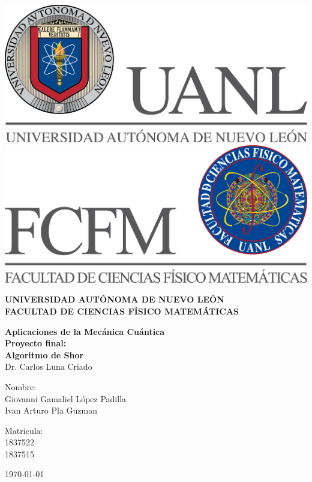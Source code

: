 \begin{titlepage}
\begin{center}
\includegraphics[scale=0.40]{Images/uanl.png}
\hspace{2.5cm}
\includegraphics[scale=0.40]{Images/fcfm.png}
\end{center}
\vspace{1.5cm}
\begin{center}
\large{\textbf{
UNIVERSIDAD AUTÓNOMA DE NUEVO LEÓN\\
FACULTAD DE CIENCIAS
FÍSICO MATEMÁTICAS}}\\
\vspace*{2.5cm}
\begin{large}
\textbf{Aplicaciones de la Mecánica Cuántica}\\
\textbf{Proyecto final:\\ Algoritmo de Shor \vspace{0.5cm}\\}
Dr. Carlos Luna Criado\\
\end{large}
\vspace{3.5cm}
\begin{minipage}{0.6\linewidth}
\vspace{0.5cm}
\changefontsizes{14pt}
Nombre:\\
Giovanni Gamaliel López Padilla\\
Ivan Arturo Pla Guzman\\
\end{minipage}
\begin{minipage}{0.2\linewidth}
\changefontsizes{14pt}
Matricula:\\
1837522\\
1837515
\end{minipage}
\end{center}
\vspace{4cm}
\begin{flushright}
\today
\end{flushright}
\pagebreak
\end{titlepage}